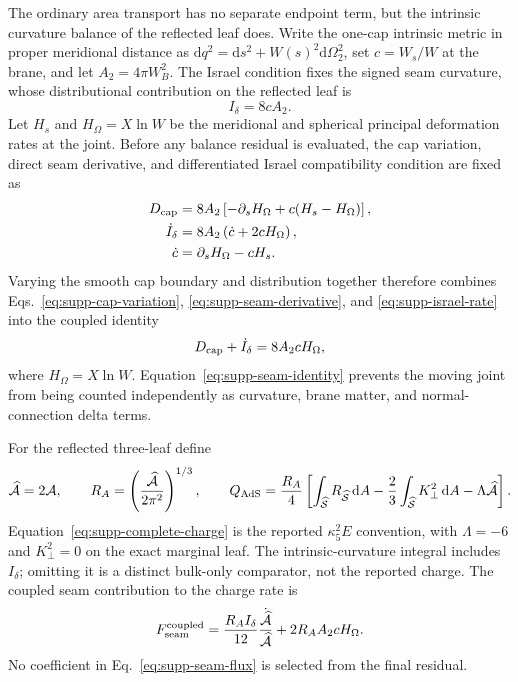 \documentclass[11pt]{article}
\newcommand{\dd}{\mathrm{d}}
\begin{document}
The ordinary area transport has no separate endpoint term, but the intrinsic
curvature balance of the reflected leaf does.  Write the one-cap intrinsic
metric in proper meridional distance as
$\dd q^2=\dd s^2+W(s)^2\dd\Omega_2^2$, set $c=W_s/W$ at the brane, and let
$A_2=4\pi W_B^2$.  The Israel condition fixes the signed seam curvature,
whose distributional contribution on the reflected leaf is
\begin{equation}
I_\delta=8cA_2.
\end{equation}
Let $H_s$ and $H_\Omega=X\ln W$ be the meridional and spherical principal
deformation rates at the joint.  Before any balance residual is evaluated, the
cap variation, direct seam derivative, and differentiated Israel compatibility
condition are fixed as
\begin{align}
D_{\rm cap}
 &=8A_2\left[-\partial_sH_\Omega+c(H_s-H_\Omega)\right],
\label{eq:supp-cap-variation}\\
\dot I_\delta
 &=8A_2\left(\dot c+2cH_\Omega\right),
\label{eq:supp-seam-derivative}\\
\dot c&=\partial_sH_\Omega-cH_s.
\label{eq:supp-israel-rate}
\end{align}
Varying the smooth cap boundary and distribution together therefore combines
Eqs.~\eqref{eq:supp-cap-variation}, \eqref{eq:supp-seam-derivative}, and
\eqref{eq:supp-israel-rate} into the coupled identity
\begin{equation}
D_{\rm cap}+\dot I_\delta=8A_2cH_\Omega,
\label{eq:supp-seam-identity}
\end{equation}
where $H_\Omega=X\ln W$.  Equation~\eqref{eq:supp-seam-identity} prevents the
moving joint from being counted independently as curvature, brane matter, and
normal-connection delta terms.

For the reflected three-leaf define
\begin{equation}
\widehat{\mathcal A}=2\mathcal A,\qquad
R_A=\left(\frac{\widehat{\mathcal A}}{2\pi^2}\right)^{1/3},\qquad
Q_{\rm AdS}=\frac{R_A}{4}\left[
\int_{\widehat{\mathcal S}}R_{\widehat{\mathcal S}}\,\dd A
-\frac{2}{3}\int_{\widehat{\mathcal S}}K_\perp^2\,\dd A
-\Lambda\widehat{\mathcal A}\right].
\label{eq:supp-complete-charge}
\end{equation}
Equation~\eqref{eq:supp-complete-charge} is the reported $\kappa_5^2E$
convention, with $\Lambda=-6$ and
$K_\perp^2=0$ on the exact marginal leaf.  The intrinsic-curvature integral
includes $I_\delta$; omitting it is a distinct bulk-only comparator, not the
reported charge.  The coupled seam contribution to the charge rate is
\begin{equation}
F_{\rm seam}^{\rm coupled}
=\frac{R_AI_\delta}{12}
\frac{\dot{\widehat{\mathcal A}}}{\widehat{\mathcal A}}
+2R_AA_2cH_\Omega.
\label{eq:supp-seam-flux}
\end{equation}
No coefficient in Eq.~\eqref{eq:supp-seam-flux} is selected from the final
residual.
\end{document}
